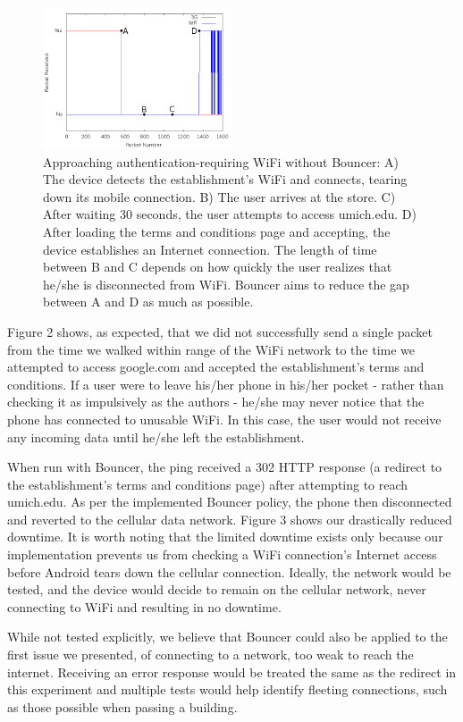 \begin{figure}
	\includegraphics[width=0.5\textwidth]{paneraNoPolicy}
	\caption{Approaching authentication-requiring WiFi without Bouncer: A) The device detects the establishment's WiFi and connects, tearing down its mobile connection. B) The user arrives at the store. C) After waiting 30 seconds, the user attempts to access umich.edu. D) After loading the terms and conditions page and accepting, the device establishes an Internet connection. The length of time between B and C depends on how quickly the user realizes that he/she is disconnected from WiFi. Bouncer aims to reduce the gap between A and D as much as possible.}
\end{figure}

Figure 2 shows, as expected, that we did not successfully send a single packet from the time we walked within range of the WiFi network to the time we attempted to access google.com and accepted the establishment's terms and conditions. If a user were to leave his/her phone in his/her pocket - rather than checking it as impulsively as the authors - he/she may never notice that the phone has connected to unusable WiFi. In this case, the user would not receive any incoming data until he/she left the establishment.

When run with Bouncer, the ping received a 302 HTTP response (a redirect to the establishment's terms and conditions page) after attempting to reach umich.edu. As per the implemented Bouncer policy, the phone then disconnected and reverted to the cellular data network. Figure 3 shows our drastically reduced downtime. It is worth noting that the limited downtime exists only because our implementation prevents us from checking a WiFi connection's Internet access before Android tears down the cellular connection. Ideally, the network would be tested, and the device would decide to remain on the cellular network, never connecting to WiFi and resulting in no downtime.

While not tested explicitly, we believe that Bouncer could also be applied to the first issue we presented, of connecting to a network, too weak to reach the internet. Receiving an error response would be treated the same as the redirect in this experiment and multiple tests would help identify fleeting connections, such as those possible when passing a building.

